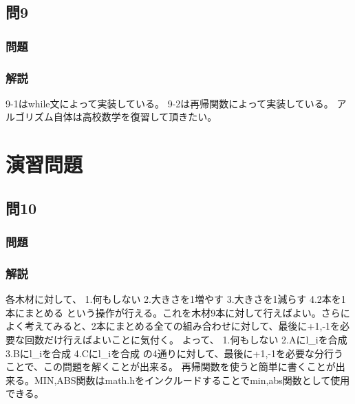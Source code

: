 \subsection{問9}
\subsubsection{問題}

\subsubsection{解説}

9-1はwhile文によって実装している。
9-2は再帰関数によって実装している。
アルゴリズム自体は高校数学を復習して頂きたい。

\section{演習問題}
\subsection{問10}
\subsubsection{問題}

\subsubsection{解説}

各木材に対して、
1.何もしない
2.大きさを1増やす
3.大きさを1減らす
4.2本を1本にまとめる
という操作が行える。これを木材9本に対して行えばよい。さらによく考えてみると、2本にまとめる全ての組み合わせに対して、最後に+1,-1を必要な回数だけ行えばよいことに気付く。
よって、
1.何もしない
2.Aにl_iを合成
3.Bにl_iを合成
4.Cにl_iを合成
の4通りに対して、最後に+1,-1を必要な分行うことで、この問題を解くことが出来る。
再帰関数を使うと簡単に書くことが出来る。MIN,ABS関数はmath.hをインクルードすることでmin,abs関数として使用できる。
